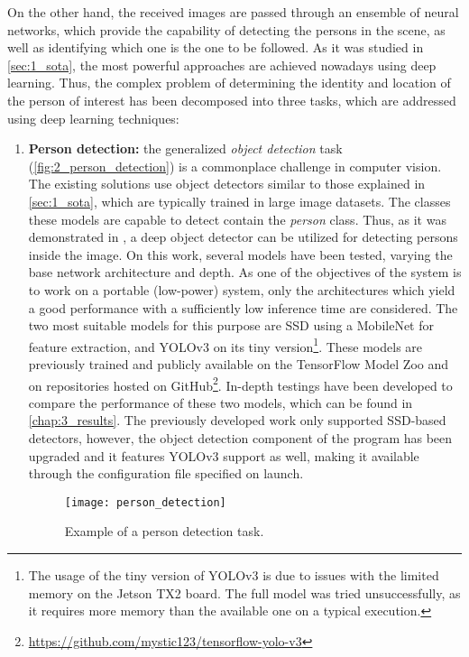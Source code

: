 On the other hand, the received images are passed through an ensemble of neural networks, which provide the capability of detecting the persons in the scene, as well as identifying which one is the one to be followed. As it was studied in \autoref{sec:1_sota}, the most powerful approaches are achieved nowadays using deep learning. Thus, the complex problem of determining the identity and location of the person of interest has been decomposed into three tasks, which are addressed using deep learning techniques:
\begin{enumerate}
	\item \textbf{Person detection:} the generalized \textit{object detection} task (\autoref{fig:2_person_detection}) is a commonplace challenge in computer vision. The existing solutions use object detectors similar to those explained in \autoref{sec:1_sota}, which are typically trained in large image datasets. The classes these models are capable to detect contain the \textit{person} class. Thus, as it was demonstrated in \cite{tfg}, a deep object detector can be utilized for detecting persons inside the image. On this work, several models have been tested, varying the base network architecture and depth. As one of the objectives of the system is to work on a portable (low-power) system, only the architectures which yield a good performance with a sufficiently low inference time are considered. The two most suitable models for this purpose are SSD \cite{ssd} using a MobileNet \cite{mobilenet} for feature extraction, and YOLOv3 \cite{yolov3} on its tiny version\footnote{The usage of the tiny version of YOLOv3 is due to issues with the limited memory on the Jetson TX2 board. The full model was tried unsuccessfully, as it requires more memory than the available one on a typical execution.}. These models are previously trained and publicly available on the TensorFlow Model Zoo \cite{model_zoo} and on repositories hosted on GitHub\footnote{\url{https://github.com/mystic123/tensorflow-yolo-v3}}. In-depth testings have been developed to compare the performance of these two models, which can be found in \autoref{chap:3_results}. The previously developed work \cite{tfg} only supported SSD-based detectors, however, the object detection component of the program has been upgraded and it features YOLOv3 support as well, making it available through the configuration file specified on launch.
	
\begin{figure}[h]
	\centering
	\texttt{[image: person\_detection]}
	\caption{Example of a person detection task.}
	\label{fig:2_person_detection}
\end{figure}
	

\end{enumerate}
